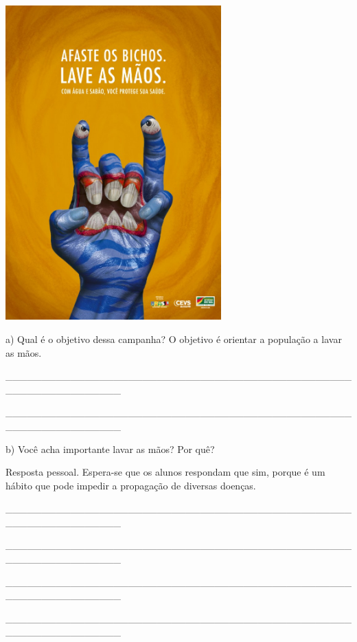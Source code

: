\includegraphics[width=3.27083in,height=4.76432in]{media/image10.jpeg}

a) Qual é o objetivo dessa campanha? O objetivo é orientar a população a
lavar as mãos.

\protect\hypertarget{_Hlk127604103}{}{}\_\_\_\_\_\_\_\_\_\_\_\_\_\_\_\_\_\_\_\_\_\_\_\_\_\_\_\_\_\_\_\_\_\_\_\_\_\_\_\_\_\_\_\_\_\_\_\_\_\_\_\_\_\_\_\_\_\_\_\_\_\_\_\_

\_\_\_\_\_\_\_\_\_\_\_\_\_\_\_\_\_\_\_\_\_\_\_\_\_\_\_\_\_\_\_\_\_\_\_\_\_\_\_\_\_\_\_\_\_\_\_\_\_\_\_\_\_\_\_\_\_\_\_\_\_\_\_\_

b) Você acha importante lavar as mãos? Por quê?

Resposta pessoal. Espera-se que os alunos respondam que sim, porque é um
hábito que pode impedir a propagação de diversas doenças.

\_\_\_\_\_\_\_\_\_\_\_\_\_\_\_\_\_\_\_\_\_\_\_\_\_\_\_\_\_\_\_\_\_\_\_\_\_\_\_\_\_\_\_\_\_\_\_\_\_\_\_\_\_\_\_\_\_\_\_\_\_\_\_\_

\_\_\_\_\_\_\_\_\_\_\_\_\_\_\_\_\_\_\_\_\_\_\_\_\_\_\_\_\_\_\_\_\_\_\_\_\_\_\_\_\_\_\_\_\_\_\_\_\_\_\_\_\_\_\_\_\_\_\_\_\_\_\_\_

\_\_\_\_\_\_\_\_\_\_\_\_\_\_\_\_\_\_\_\_\_\_\_\_\_\_\_\_\_\_\_\_\_\_\_\_\_\_\_\_\_\_\_\_\_\_\_\_\_\_\_\_\_\_\_\_\_\_\_\_\_\_\_\_

\_\_\_\_\_\_\_\_\_\_\_\_\_\_\_\_\_\_\_\_\_\_\_\_\_\_\_\_\_\_\_\_\_\_\_\_\_\_\_\_\_\_\_\_\_\_\_\_\_\_\_\_\_\_\_\_\_\_\_\_\_\_\_\_

